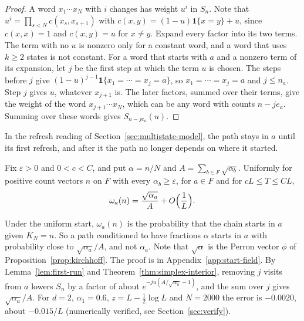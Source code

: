 \begin{proof}
A word $x_1\cdots x_N$ with $i$ changes has weight $u^i$ in $S_n$. Note that
$u^i=\prod_{s<N}c(x_s,x_{s+1})$ with $c(x,y)=(1-u)\mathbf 1\{x=y\}+u$, since
$c(x,x)=1$ and $c(x,y)=u$ for $x\ne y$. Expand every factor into its two terms.
The term with no $u$ is nonzero only for a constant word, and a word that uses
$k\ge2$ states is not constant. For a word that starts with $a$ and a nonzero
term of its expansion, let $j$ be the first step at which the term $u$ is
chosen. The steps before $j$ give $(1-u)^{j-1}\mathbf 1\{x_1=\cdots=x_j=a\}$,
so $x_1=\cdots=x_j=a$ and $j\le n_a$. Step $j$ gives $u$, whatever $x_{j+1}$
is. The later factors, summed over their terms, give the weight of the word
$x_{j+1}\cdots x_N$, which can be any word with counts $n-je_a$. Summing over
these words gives $S_{n-je_a}(u)$.
\end{proof}

In the refresh reading of Section~\ref{sec:multistate-model}, the path stays in
$a$ until its first refresh, and after it the path no longer depends on where it
started.

\begin{proposition}\label{prop:start-weights}
Fix $\varepsilon>0$ and $0<c<C$, and put $\alpha=n/N$ and
$A=\sum_{b\in F}\sqrt{\alpha_b}$. Uniformly for positive count vectors $n$ on
$F$ with every $\alpha_b\ge\varepsilon$, for $a\in F$ and for $cL\le T\le CL$,
\[
 \omega_a(n)=\frac{\sqrt{\alpha_a}}A+O\Bigl(\frac1L\Bigr).
\]
\end{proposition}

Under the uniform start, $\omega_a(n)$ is the probability that the chain starts
in $a$ given $K_N=n$. So a path conditioned to have fractions $\alpha$ starts in
$a$ with probability close to $\sqrt{\alpha_a}/A$, and not $\alpha_a$. Note that
$\sqrt\alpha$ is the Perron vector $\phi$ of Proposition~\ref{prop:kirchhoff}.
The proof is in Appendix~\ref{app:start-field}. By Lemma~\ref{lem:first-run}
and Theorem~\ref{thm:simplex-interior}, removing $j$ visits from $a$ lowers
$S_n$ by a factor of about $e^{-ju(A/\sqrt{\alpha_a}-1)}$, and the sum over $j$
gives $\sqrt{\alpha_a}/A$. For $d=2$, $\alpha_1=0.6$, $z=L-\frac12\log L$ and
$N=2000$ the error is $-0.0020$, about $-0.015/L$ (numerically verified, see
Section~\ref{sec:verify}).


